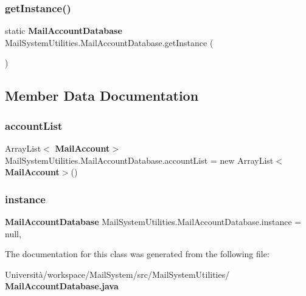 \subsubsection{get\+Instance()}
{\footnotesize\ttfamily static \textbf{ Mail\+Account\+Database} Mail\+System\+Utilities.\+Mail\+Account\+Database.\+get\+Instance (\begin{DoxyParamCaption}{ }\end{DoxyParamCaption})\hspace{0.3cm}{\ttfamily [static]}}



\subsection{Member Data Documentation}
\mbox{\label{class_mail_system_utilities_1_1_mail_account_database_a3193db2da70901df1c63de098642e136}} 
\subsubsection{account\+List}
{\footnotesize\ttfamily Array\+List$<$\textbf{ Mail\+Account}$>$ Mail\+System\+Utilities.\+Mail\+Account\+Database.\+account\+List = new Array\+List$<$\textbf{ Mail\+Account}$>$()\hspace{0.3cm}{\ttfamily [package]}}

\mbox{\label{class_mail_system_utilities_1_1_mail_account_database_aea82a37738eecf87505a1f967e873e0c}} 
\subsubsection{instance}
{\footnotesize\ttfamily \textbf{ Mail\+Account\+Database} Mail\+System\+Utilities.\+Mail\+Account\+Database.\+instance = null\hspace{0.3cm}{\ttfamily [static]}, {\ttfamily [private]}}



The documentation for this class was generated from the following file\+:\begin{DoxyCompactItemize}
\item 
Università/workspace/\+Mail\+System/src/\+Mail\+System\+Utilities/\textbf{ Mail\+Account\+Database.\+java}\end{DoxyCompactItemize}
